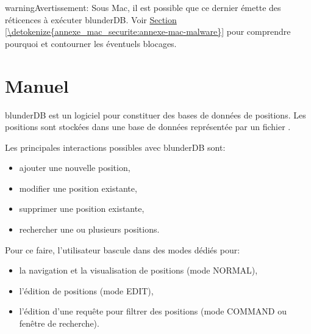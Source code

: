 \documentclass[letterpaper,10pt,french]{sphinxmanual}
\begin{document}
\begin{sphinxadmonition}{warning}{Avertissement:}
\sphinxAtStartPar
Sous Mac, il est possible que ce dernier émette des réticences
à exécuter blunderDB. Voir \hyperref[\detokenize{annexe_mac_securite:annexe-mac-malware}]{Section \ref{\detokenize{annexe_mac_securite:annexe-mac-malware}}} pour comprendre
pourquoi et contourner les éventuels blocages.
\end{sphinxadmonition}

\sphinxstepscope


\section{Manuel}
\label{\detokenize{manuel:manuel}}\label{\detokenize{manuel:id1}}\label{\detokenize{manuel::doc}}
\sphinxAtStartPar
blunderDB est un logiciel pour constituer des bases de données de
positions. Les positions sont stockées dans une base de données représentée par un fichier
.

\sphinxAtStartPar
Les principales interactions possibles avec blunderDB sont:
\begin{itemize}
\item {} 
\sphinxAtStartPar
ajouter une nouvelle position,

\item {} 
\sphinxAtStartPar
modifier une position existante,

\item {} 
\sphinxAtStartPar
supprimer une position existante,

\item {} 
\sphinxAtStartPar
rechercher une ou plusieurs positions.

\end{itemize}

\sphinxAtStartPar
Pour ce faire, l’utilisateur bascule dans des modes dédiés pour:
\begin{itemize}
\item {} 
\sphinxAtStartPar
la navigation et la visualisation de positions (mode NORMAL),

\item {} 
\sphinxAtStartPar
l’édition de positions (mode EDIT),

\item {} 
\sphinxAtStartPar
l’édition d’une requête pour filtrer des positions (mode COMMAND ou fenêtre de recherche).

\end{itemize}
\end{document}
